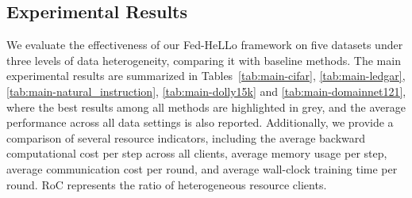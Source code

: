\documentclass[lettersize,journal]{IEEEtran}
\begin{document}
\subsection{Experimental Results}\label{exp:main-results}
We evaluate the effectiveness of our Fed-HeLLo framework on five datasets under three levels of data heterogeneity, comparing it with baseline methods. The main experimental results are summarized in Tables~\ref{tab:main-cifar}, \ref{tab:main-ledgar}, \ref{tab:main-natural_instruction}, \ref{tab:main-dolly15k} and \ref{tab:main-domainnet121}, where the best results among all methods are highlighted in \colorbox[rgb]{ .749,  .749,  .749}{grey}, and the average performance across all data settings is also reported. 
{Additionally, we provide a comparison of several resource indicators, including the average backward computational cost per step across all clients, average memory usage per step, average communication cost per round, and average wall-clock training time per round.
RoC represents the ratio of heterogeneous resource clients.}

\end{document}
